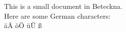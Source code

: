 \documentclass{article}
\begin{document}
This is a small document in Beteckna.
\\
Here are some German characters:
\\
äÄ öÖ üÜ ß
\end{document}
